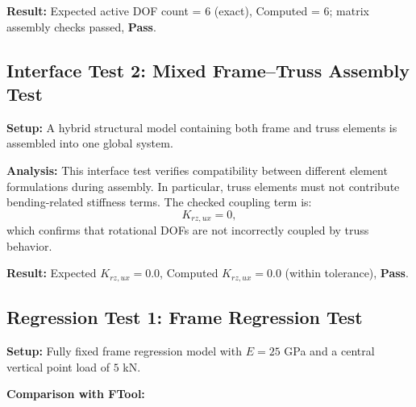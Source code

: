 \textbf{Result:} Expected active DOF count = 6 (exact), Computed = 6; matrix assembly checks passed, \textbf{Pass}.

\subsection*{Interface Test 2: Mixed Frame--Truss Assembly Test}

\textbf{Setup:} A hybrid structural model containing both frame and truss elements is assembled into one global system.

\textbf{Analysis:}
This interface test verifies compatibility between different element formulations during assembly. In particular, truss elements must not contribute bending-related stiffness terms. The checked coupling term is:
\[
K_{rz,ux} = 0,
\]
which confirms that rotational DOFs are not incorrectly coupled by truss behavior.

\textbf{Result:} Expected $K_{rz,ux} = 0.0$, Computed $K_{rz,ux} = 0.0$ (within tolerance), \textbf{Pass}.

\clearpage
\subsection*{Regression Test 1: Frame Regression Test}

\textbf{Setup:} Fully fixed frame regression model with $E = 25$ GPa and a central vertical point load of $5$ kN.

\textbf{Comparison with FTool:}

\begin{table}[h!]
\centering
\caption{Regression Test 1: frame response comparison}
\label{tab:regression_frame_comparison}
\small
\setlength{\tabcolsep}{6pt}
\renewcommand{\arraystretch}{1.12}
\end{table}

